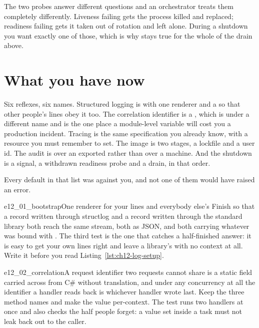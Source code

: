 \noindent
The two probes answer different questions and an orchestrator treats them
completely differently. Liveness failing gets the process killed and
replaced; readiness failing gets it taken out of rotation and left alone.
During a shutdown you want exactly one of those, which is why
 stays true for the whole of the drain above.

\section{What you have now}
\label{sec:ch12-summary}

Six reflexes, six names. Structured logging is  with one
renderer and a  so that other people's lines
obey it too. The correlation identifier is a , which is
 under a different name and is the one place a
module-level variable will cost you a production incident. Tracing is the
same specification you already know, with a resource you must remember to
set. The image is two stages, a lockfile and a user id. The audit is
 over an exported  rather than over a
machine. And the shutdown is a signal, a withdrawn readiness probe and a
drain, in that order.

Every default in that list was against you, and not one of them would have
raised an error.

\begin{exercise}{e12_01_bootstrap}{One renderer for your lines and everybody else's}
Finish  so that a record written through structlog
and a record written through the standard library both reach the same
stream, both as JSON, and both carrying whatever was bound with
. The third test is the one that catches a
half-finished answer: it is easy to get your own lines right and leave a
library's with no context at all. Write it before you read
Listing~\ref{lst:ch12-log-setup}.
\end{exercise}

\begin{exercise}{e12_02_correlation}{A request identifier two requests cannot share}
 is a static field carried across from C\# without
translation, and under any concurrency at all the identifier a handler
reads back is whichever handler wrote last. Keep the three method names
and make the value per-context. The test runs two handlers at once and
also checks the half people forget: a value set inside a task must not
leak back out to the caller.
\end{exercise}

